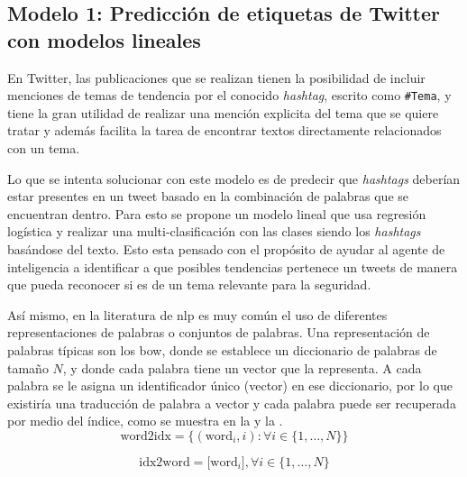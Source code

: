 \subsection{Modelo 1: Predicción de etiquetas de Twitter con modelos lineales} \label{sec:twitter-prediction}
En Twitter, las publicaciones que se realizan tienen la posibilidad de incluir menciones de temas de tendencia por el conocido \emph{hashtag}, escrito como \texttt{\#Tema}, y tiene la gran utilidad de realizar una mención explicita del tema que se quiere tratar y además facilita la tarea de encontrar textos directamente relacionados con un tema.


Lo que se intenta solucionar con este modelo es de predecir que \emph{hashtags} deberían estar presentes en un tweet basado en la combinación de palabras que se encuentran dentro. Para esto se propone un modelo lineal que usa regresión logística y realizar una multi-clasificación con las clases siendo los \emph{hashtags} basándose del texto. Esto esta pensado con el propósito de ayudar al agente de inteligencia a identificar a que posibles tendencias pertenece un tweets de manera que pueda reconocer si es de un tema relevante para la seguridad.

Así mismo, en la literatura de \gls{nlp} es muy común el uso de diferentes representaciones de palabras o conjuntos de palabras. Una representación de palabras típicas son los \gls{bow}, donde se establece un diccionario de palabras de tamaño $N$, y donde cada palabra tiene un vector que la representa. A cada palabra se le asigna un identificador único (vector) en ese diccionario, por lo que existiría una traducción de palabra a vector y cada palabra puede ser recuperada por medio del índice, como se muestra en la  y la .
\begin{equation} \label{eq:bow-repr1}
  \text{word2idx} = \Big\{(\text{word}_i, i) : \forall i \in \{1, \ldots, N\} \Big\}
\end{equation}

\begin{equation} \label{eq:bow-repr2}
  \text{idx2word} = \Big[\text{word}_i\Big], \forall i \in \{1, \ldots, N\}
\end{equation}

